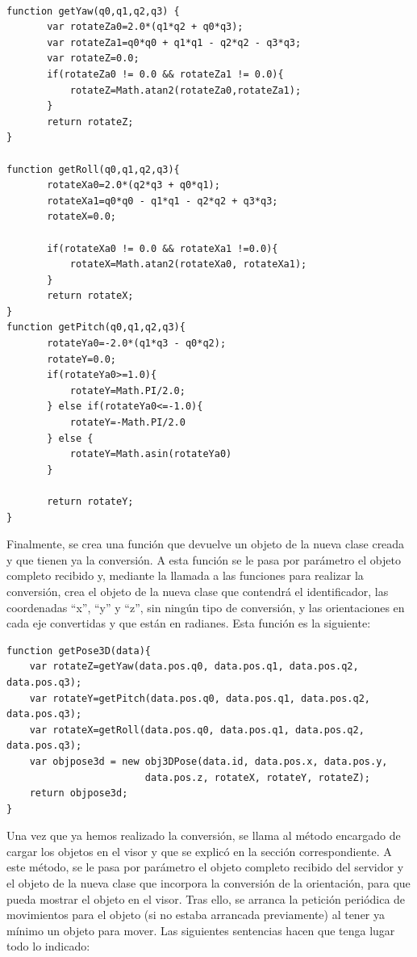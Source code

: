\begin{lstlisting}[frame=single]

function getYaw(q0,q1,q2,q3) {
       var rotateZa0=2.0*(q1*q2 + q0*q3);
       var rotateZa1=q0*q0 + q1*q1 - q2*q2 - q3*q3;
       var rotateZ=0.0;
       if(rotateZa0 != 0.0 && rotateZa1 != 0.0){
           rotateZ=Math.atan2(rotateZa0,rotateZa1);
       }
       return rotateZ;
}

function getRoll(q0,q1,q2,q3){
       rotateXa0=2.0*(q2*q3 + q0*q1);
       rotateXa1=q0*q0 - q1*q1 - q2*q2 + q3*q3;
       rotateX=0.0;

       if(rotateXa0 != 0.0 && rotateXa1 !=0.0){
           rotateX=Math.atan2(rotateXa0, rotateXa1);
       }
       return rotateX;
}
function getPitch(q0,q1,q2,q3){
       rotateYa0=-2.0*(q1*q3 - q0*q2);
       rotateY=0.0;
       if(rotateYa0>=1.0){
           rotateY=Math.PI/2.0;
       } else if(rotateYa0<=-1.0){
           rotateY=-Math.PI/2.0
       } else {
           rotateY=Math.asin(rotateYa0)
       }

       return rotateY;
}
\end{lstlisting}

Finalmente, se crea una función que devuelve un objeto de la nueva clase creada y que tienen ya la conversión. A esta función se le pasa por parámetro el objeto completo recibido y, mediante la llamada a las funciones para realizar la conversión, crea el objeto de la nueva clase que contendrá el identificador, las coordenadas ``x'', ``y'' y ``z'', sin ningún tipo de conversión, y las orientaciones en cada eje convertidas y que están en radianes. Esta función es la siguiente:

\begin{lstlisting}[frame=single]
function getPose3D(data){
	var rotateZ=getYaw(data.pos.q0, data.pos.q1, data.pos.q2, data.pos.q3);
	var rotateY=getPitch(data.pos.q0, data.pos.q1, data.pos.q2, data.pos.q3);
	var rotateX=getRoll(data.pos.q0, data.pos.q1, data.pos.q2, data.pos.q3);
	var objpose3d = new obj3DPose(data.id, data.pos.x, data.pos.y,
						data.pos.z, rotateX, rotateY, rotateZ);
	return objpose3d;
}
\end{lstlisting}

Una vez que ya hemos realizado la conversión, se llama al método encargado de cargar los objetos en el visor y que se explicó en la sección correspondiente. A este método, se le pasa por parámetro el objeto completo recibido del servidor y el objeto de la nueva clase que incorpora la conversión de la orientación, para que pueda mostrar el objeto en el visor. Tras ello, se arranca la petición periódica de movimientos para el objeto (si no estaba arrancada previamente) al tener ya mínimo un objeto para mover. Las siguientes sentencias hacen que tenga lugar todo lo indicado:

